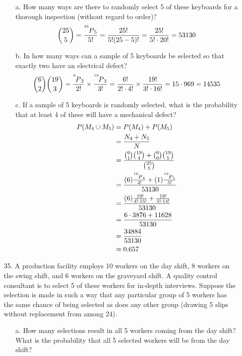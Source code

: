 \documentclass[letterpaper,12pt]{article}
\newcommand\perm[2]{\prescript{^{#1}\mkern-2.5mu}{}P_{#2}}
\newcommand\calc[1]{\pgfmathparse{#1}\pgfmathprintnumber{\pgfmathresult}}
\newcommand\comba[2]{\frac{\perm{#1}{#2}}{#2!}}
\newcommand\combb[2]{\frac{#1!}{#2!(#1 - #2)!}}
\newcommand\combc[2]{\frac{#1!}{#2! \cdot \calc{#1 - #2}!}}
\begin{document}
\begin{enumerate}
    \begin{enumerate}
      \item[a.]
        How many ways are there to randomly select 5 of these keyboards for a thorough inspection (without regard to order)?
        \begin{align*}
          \binom{25}{5} = \comba{25}{5} = \combb{25}{5} = \combc{25}{5} = 53130
        \end{align*}
      \item[b.]
        In how many ways can a sample of 5 keyboards be selected so that exactly two have an electrical defect?
        \begin{align*}
          \binom{6}{2} \binom{19}{3} = \comba{6}{2} \times \comba{19}{3} = \combc{6}{2} \times \combc{19}{3} = 15 \cdot 969 = 14535
        \end{align*}
      \item[c.]
        If a sample of 5 keyboards is randomly selected, what is the probability that at least 4 of these will have a mechanical defect?
        \begin{align*}
          P(M_4 \cup M_5) &= P(M_4) + P(M_5) \\
          &= \frac{N_4 + N_5}{N} \\
          &= \frac{\binom{6}{1} \binom{19}{4} + \binom{6}{0} \binom{19}{5}}{\binom{25}{5}} \\
          &= \frac{(6)\comba{19}{4} + (1)\comba{19}{5}}{53130} \\
          &= \frac{(6)\combc{19}{4} + \combc{19}{5}}{53130} \\
          &= \frac{6 \cdot 3876 + 11628}{53130} \\
          &= \frac{34884}{53130} \\
          &\approx 0.657
        \end{align*}
    \end{enumerate}
  \item[35.]
    A production facility employs 10 workers on the day shift, 8 workers on the swing shift, and 6 workers on the graveyard shift. A quality control consultant is to select 5 of these workers for in-depth interviews. Suppose the selection is made in such a way that any particular group of 5 workers has the same chance of being selected as does any other group (drawing 5 slips without replacement from among 24).
    \begin{enumerate}
      \item[a.]
        How many selections result in all 5 workers coming from the day shift? What is the probability that all 5 selected workers will be from the day shift?

\end{enumerate}
\end{enumerate}
\end{document}
